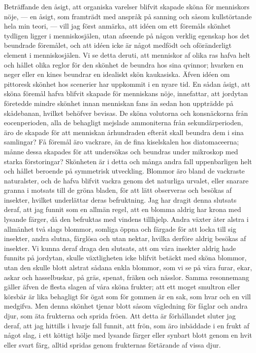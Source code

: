 Beträffande den åsigt, att organiska varelser blifvit skapade sköna för menniskors nöje, — en åsigt, som framträdt med anspråk på sanning och såsom kullstörtande hela min teori, — vill jag först anmärka, att idéen om ett föremåls skönhet tydligen ligger i menniskosjälen, utan afseende på någon verklig egenskap hos det beundrade föremålet, och att idéen icke är något medfödt och oföränderligt element i menniskosjälen. Vi se detta deruti, att menniskor af olika ras hafva helt och hållet olika reglor för den skönhet de beundra hos sina qvinnor; hvarken en neger eller en kines beundrar en idealiskt skön kaukasiska. Äfven idéen om pittoresk skönhet hos scenerier har uppkommit i en nyare tid. En sådan åsigt, att sköna föremål hafva blifvit skapade för menniskans nöje, innefattar, att jordytan företedde mindre skönhet innan menniskan fans än sedan hon uppträdde på skådebanan, hvilket behöfver bevisas. De sköna volutorna och konsnäckorna från eocenperioden, alla de behagligt mejslade ammoniterna från sekundärperioden, äro de skapade för att menniskan århundraden efteråt skall beundra dem i sina samlingar? Få föremål äro vackrare, än de fina kiselskalen hos diatomaceerna; månne dessa skapades för att undersökas och beundras under mikroskop med starka förstoringar? Skönheten är i detta och många andra fall uppenbarligen helt och hållet beroende på symmetrisk utveckling. Blommor äro bland de vackraste naturalster, och de hafva blifvit vackra genom det naturliga urvalet, eller snarare granna i motsats till de gröna bladen, för att lätt observeras och besökas af insekter, hvilket underlättar deras befruktning. Jag har dragit denna slutsats deraf, att jag funnit som en allmän regel, att en blomma aldrig har krona med lysande färger, då den befruktas med vindens tillhjelp. Andra växter åter alstra i allmänhet två slags blommor, somliga öppna och färgade för att locka till sig insekter, andra slutna, färglösa och utan nektar, hvilka derföre aldrig besökas af insekter. Vi kunna deraf draga den slutsats, att om våra insekter aldrig hade funnits på jordytan, skulle växtligheten icke blifvit betäckt med sköna blommor, utan den skulle blott alstrat sådana enkla blommor, som vi se på våra furar, ekar, askar och hasselbuskar, på gräs, spenat, fräken och nässlor. Samma resonnemang gäller äfven de flesta slagen af våra sköna frukter; att ett moget smultron eller körsbär är lika behagligt för ögat som för gommen är en sak, som hvar och en vill medgifva. Men denna skönhet tjenar blott såsom vägledning för fåglar och andra djur, som äta frukterna och sprida fröen. Att detta är förhållandet sluter jag deraf, att jag hittills i hvarje fall funnit, att frön, som äro inbäddade i en frukt af något slag, i ett köttigt hölje med lysande färger eller synbart blott genom en hvit eller svart färg, alltid spridas genom frukternas förtärande af vissa djur.

